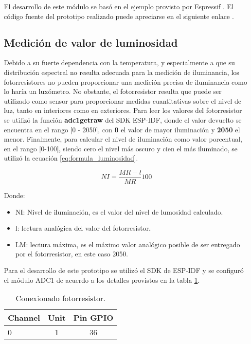 El desarrollo de este módulo se basó en el ejemplo provisto por Espressif \cite{ESP32_ADC1_Example}. El código fuente del prototipo realizado puede apreciarse en el siguiente enlace \cite{ESP32_POC_joystick}.


\subsection{Medición de valor de luminosidad}
Debido a su fuerte dependencia con la temperatura, y especialmente a que su distribución espectral no resulta adecuada para la medición de iluminancia, los fotorresistores no pueden proporcionar una medición precisa de iluminancia como lo haría un luxómetro. No obstante, el fotorresistor resulta que puede ser utilizado como sensor para proporcionar medidas cuantitativas sobre el nivel de luz, tanto en interiores como en exteriores.
Para leer los valores del fotorresistor se utilizó la función \textbf{adc1\textunderscore get\textunderscore raw } del SDK ESP-IDF, donde el valor devuelto se encuentra en el rango [0 - 2050], con \textbf{0} el valor de mayor iluminación y \textbf{2050} el menor.
Finalmente, para calcular el nivel de iluminación como valor porcentual, en el rango [0-100], siendo cero el nivel más oscuro y cien el más iluminado, se utilizó la ecuación \ref{eq:formula_luminosidad}.

\begin{equation}
	\label{eq:formula_luminosidad}
	NI=\frac{MR - l}{MR} 100
\end{equation}


Donde:
\begin{itemize}
	\item NI: Nivel de iluminación, es el valor del nivel de lumosidad calculado.
	\item l: lectura analógica del valor del fotorresistor.
	\item LM: lectura máxima, es el máximo valor analógico posible de ser entregado por el fotorresistor, en este caso 2050.
\end{itemize}

Para el desarrollo de este prototipo se utilizó el SDK de ESP-IDF y se configuró el módulo ADC1 de acuerdo a los detalles provistos en la tabla \ref{tab:conexionado_fotoresistor}.

\vspace{0.5cm}
\begin{table}[h]
\centering
\caption[Conexionado fotoresistor]{Conexionado fotorresistor.}
\begin{tabular}{l c c}
\toprule
\textbf{Channel} & \textbf{Unit} & \textbf{Pin GPIO}\\
\midrule
0 & 1 & 36 \\
\bottomrule
\hline
\end{tabular}
\label{tab:conexionado_fotoresistor}
\end{table}

